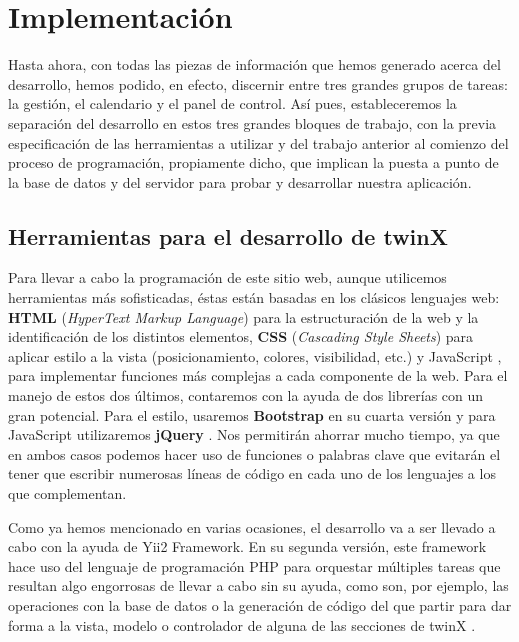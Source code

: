 \chapter{Implementación}
\label{implementacion}

Hasta ahora, con todas las piezas de información que hemos generado acerca del desarrollo, hemos podido, en efecto, discernir entre tres grandes grupos de tareas: la gestión, el calendario y el panel de control. Así pues, estableceremos la separación del desarrollo en estos tres grandes bloques de trabajo, con la previa especificación de las herramientas a utilizar y del trabajo anterior al comienzo del proceso de programación, propiamente dicho, que implican la puesta a punto de la base de datos y del servidor para probar y desarrollar nuestra aplicación.

\section{Herramientas para el desarrollo de twinX}

Para llevar a cabo la programación de este sitio web, aunque utilicemos herramientas más sofisticadas, éstas están basadas en los clásicos lenguajes web: \textbf{HTML} (\textit{HyperText Markup Language}) \cite{html} para la estructuración de la web y la identificación de los distintos elementos, \textbf{CSS} \cite{css} (\textit{Cascading Style Sheets}) para aplicar estilo a la vista (posicionamiento, colores, visibilidad, etc.) y JavaScript \cite{javascript}, para implementar funciones más complejas a cada componente de la web. Para el manejo de estos dos últimos, contaremos con la ayuda de dos librerías con un gran potencial. Para el estilo, usaremos \textbf{Bootstrap} \cite{bootstrap} en su cuarta versión y para JavaScript utilizaremos \textbf{jQuery} \cite{jquery}. Nos permitirán ahorrar mucho tiempo, ya que en ambos casos podemos hacer uso de funciones o palabras clave que evitarán el tener que escribir numerosas líneas de código en cada uno de los lenguajes a los que complementan.

Como ya hemos mencionado en varias ocasiones, el desarrollo va a ser llevado a cabo con la ayuda de Yii2 Framework. En su segunda versión, este framework hace uso del lenguaje de programación PHP para orquestar múltiples tareas que resultan algo engorrosas de llevar a cabo sin su ayuda, como son, por ejemplo, las operaciones con la base de datos o la generación de código del que partir para dar forma a la vista, modelo o controlador de alguna de las secciones de twinX \cite{yii}.

